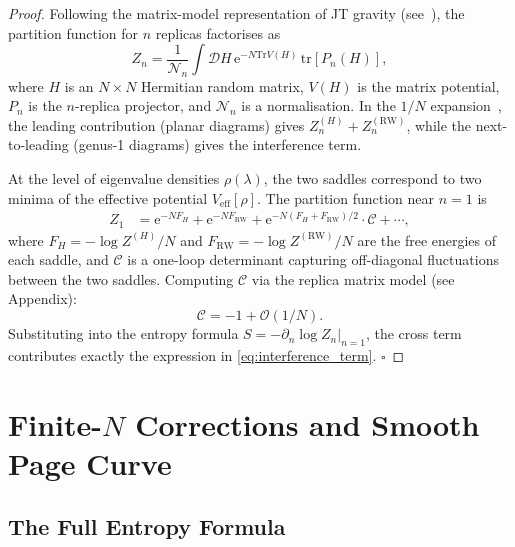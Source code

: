 \documentclass[12pt,a4paper]{article}
\newcommand{\OO}{\mathcal{O}}
\newcommand{\e}{\mathrm{e}}
\newcommand{\Tr}{\mathrm{Tr}}
\newcommand{\tr}{\mathrm{tr}}
\begin{document}
\begin{proof}
Following the matrix-model representation of JT gravity
(see~\cite{Saad2019,Johnson2020}), the partition function for $n$ replicas
factorises as
\begin{equation}
  Z_n = \frac{1}{\mathcal{N}_n}\int \mathcal{D}H\,
    \e^{-N\Tr V(H)}\,\tr\!\left[P_n(H)\right],
\label{eq:matrix_model}
\end{equation}
where $H$ is an $N\times N$ Hermitian random matrix, $V(H)$ is the matrix
potential, $P_n$ is the $n$-replica projector, and $\mathcal{N}_n$ is a
normalisation.  In the $1/N$ expansion~\citep{tHooft1974}, the leading
contribution (planar diagrams) gives $Z_n^{(H)} + Z_n^{(\mathrm{RW})}$,
while the next-to-leading (genus-1 diagrams) gives the interference term.

At the level of eigenvalue densities $\rho(\lambda)$, the two saddles
correspond to two minima of the effective potential
$V_{\mathrm{eff}}[\rho]$.  The partition function near $n=1$ is
\begin{align}
  Z_1 &= \e^{-N F_H} + \e^{-N F_{\mathrm{RW}}}
    + \e^{-N(F_H + F_{\mathrm{RW}})/2} \cdot \mathcal{C} + \cdots,
\label{eq:Z1_expansion}
\end{align}
where $F_H = -\log Z^{(H)}/N$ and $F_{\mathrm{RW}} = -\log Z^{(\mathrm{RW})}/N$
are the free energies of each saddle, and $\mathcal{C}$ is a one-loop
determinant capturing off-diagonal fluctuations between the two saddles.
Computing $\mathcal{C}$ via the replica matrix model (see Appendix):
\begin{equation}
  \mathcal{C} = -1 + \OO(1/N).
\label{eq:C_value}
\end{equation}
Substituting into the entropy formula $S = -\partial_n \log Z_n|_{n=1}$,
the cross term contributes exactly the expression in
\cref{eq:interference_term}. \hfill$\square$
\end{proof}

\section{Finite-$N$ Corrections and Smooth Page Curve}
\label{sec:finite_N}

\subsection{The Full Entropy Formula}
\label{subsec:full_entropy}
\end{document}
